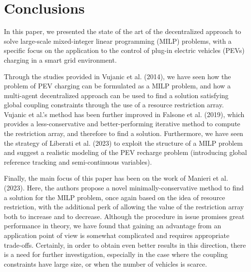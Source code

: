 \section{Conclusions}
In this paper, we presented the state of the art of the decentralized approach to solve large-scale mixed-integer linear programming (MILP) problems, with a specific focus on the application to the control of plug-in electric vehicles (PEVs) charging in a smart grid environment. 

Through the studies provided in Vujanic et al. (2014)\supercite{vujanic}, we have seen how the problem of PEV charging can be formulated as a MILP problem, and how a multi-agent decentralized approach can be used to find a solution satisfying global coupling constraints through the use of a resource restriction array. Vujanic et al.'s method has been further improved in Falsone et al. (2019)\supercite{falsone}, which provides a less-conservative and better-performing iterative method to compute the restriction array, and therefore to find a solution. Furthermore, we have seen the strategy of Liberati et al. (2023)\supercite{liberati} to exploit the structure of a MILP problem and suggest a realistic modeling of the PEV recharge problem (introducing global reference tracking and semi-continuous variables). 

Finally, the main focus of this paper has been on the work of Manieri et al. (2023)\supercite{manieri}. Here, the authors propose a novel minimally-conservative method to find a solution for the MILP problem, once again based on the idea of resource restriction, with the additional perk of allowing the value of the restriction array both to increase and to decrease. Although the procedure in issue promises great performance in theory, we have found that gaining an advantage from an application point of view is somewhat complicated and requires appropriate trade-offs. Certainly, in order to obtain even better results in this direction, there is a need for further investigation, especially in the case where the coupling constraints have large size, or when the number of vehicles is scarce.
